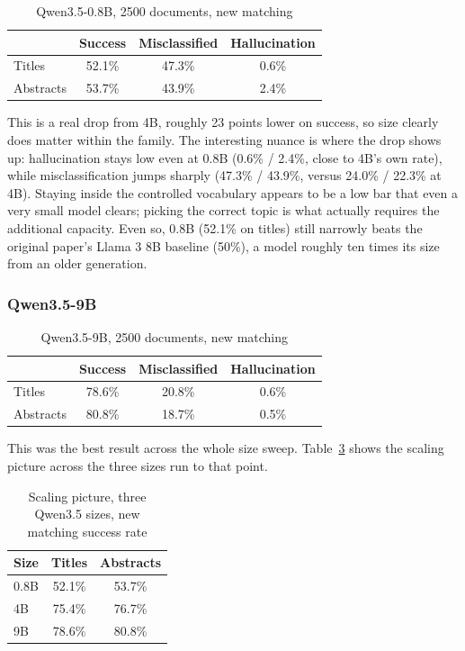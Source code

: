 \begin{table}[h]
\centering
\caption{Qwen3.5-0.8B, 2500 documents, new matching}
\label{tab:qwen35-08b}
\begin{tabular}{lccc}
\toprule
 & Success & Misclassified & Hallucination \\
\midrule
Titles & 52.1\% & 47.3\% & 0.6\% \\
Abstracts & 53.7\% & 43.9\% & 2.4\% \\
\bottomrule
\end{tabular}
\end{table}

This is a real drop from 4B, roughly 23 points lower on success, so size clearly does matter within the family. The interesting nuance is where the drop shows up: hallucination stays low even at 0.8B (0.6\% / 2.4\%, close to 4B's own rate), while misclassification jumps sharply (47.3\% / 43.9\%, versus 24.0\% / 22.3\% at 4B). Staying inside the controlled vocabulary appears to be a low bar that even a very small model clears; picking the correct topic is what actually requires the additional capacity. Even so, 0.8B (52.1\% on titles) still narrowly beats the original paper's Llama 3 8B baseline (50\%), a model roughly ten times its size from an older generation.

\subsubsection{Qwen3.5-9B}

\begin{table}[h]
\centering
\caption{Qwen3.5-9B, 2500 documents, new matching}
\label{tab:qwen35-9b}
\begin{tabular}{lccc}
\toprule
 & Success & Misclassified & Hallucination \\
\midrule
Titles & 78.6\% & 20.8\% & 0.6\% \\
Abstracts & 80.8\% & 18.7\% & 0.5\% \\
\bottomrule
\end{tabular}
\end{table}

This was the best result across the whole size sweep. Table~\ref{tab:scaling-3sizes} shows the scaling picture across the three sizes run to that point.

\begin{table}[h]
\centering
\caption{Scaling picture, three Qwen3.5 sizes, new matching success rate}
\label{tab:scaling-3sizes}
\begin{tabular}{lcc}
\toprule
Size & Titles & Abstracts \\
\midrule
0.8B & 52.1\% & 53.7\% \\
4B & 75.4\% & 76.7\% \\
9B & 78.6\% & 80.8\% \\
\bottomrule
\end{tabular}
\end{table}


